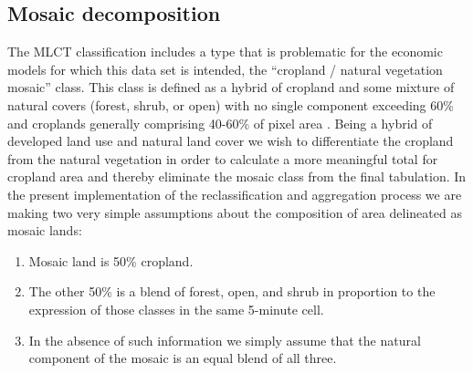 
\subsection{Mosaic decomposition}
\label{sec:elimination}

The MLCT classification includes a type that is problematic for the
economic models for which this data set is intended, the ``cropland /
natural vegetation mosaic'' class.  This class is defined as a hybrid
of cropland and some mixture of natural covers (forest, shrub, or
open) with no single component exceeding 60\% \citep{Friedl2002} and
croplands generally comprising 40-60\% of pixel area . Being a hybrid of developed land use and natural land cover
we wish to differentiate the cropland from the natural vegetation in
order to calculate a more meaningful total for cropland area and
thereby eliminate the mosaic class from the final tabulation.  In the
present implementation of the reclassification and aggregation process
we are making two very simple assumptions about the composition of
area delineated as mosaic lands:

\begin{enumerate}
\item Mosaic land is 50\% cropland.
\item The other 50\% is a blend of forest, open, and shrub in
  proportion to the expression of those classes in the same 5-minute
  cell.
\item In the absence of such information we simply assume that the
  natural component of the mosaic is an equal blend of all three.
\end{enumerate}


